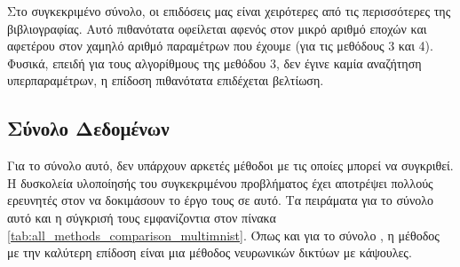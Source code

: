 Στο συγκεκριμένο σύνολο, οι επιδόσεις μας είναι χειρότερες από τις περισσότερες της βιβλιογραφίας. Αυτό πιθανότατα οφείλεται αφενός στον μικρό αριθμό εποχών και αφετέρου στον χαμηλό αριθμό παραμέτρων που έχουμε (για τις μεθόδους 3 και 4). Φυσικά, επειδή για τους αλγορίθμους της μεθόδου 3, δεν έγινε καμία αναζήτηση υπερπαραμέτρων, η επίδοση πιθανότατα επιδέχεται βελτίωση.

\subsection{Σύνολο Δεδομένων }

Για το σύνολο αυτό, δεν υπάρχουν αρκετές μέθοδοι με τις οποίες μπορεί να συγκριθεί. Η δυσκολεία υλοποίησής του συγκεκριμένου προβλήματος έχει αποτρέψει πολλούς ερευνητές στον να δοκιμάσουν το έργο τους σε αυτό. Τα πειράματα για το σύνολο αυτό και η σύγκρισή τους εμφανίζοντια στον πίνακα \ref{tab:all_methods_comparison_multimnist}. Όπως και για το σύνολο , η μέθοδος με την καλύτερη επίδοση είναι μια μέθοδος νευρωνικών δικτύων με κάψουλες.

